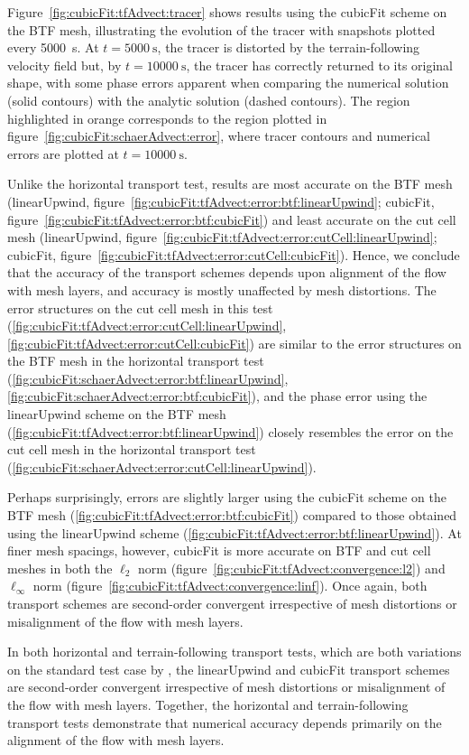 Figure~\ref{fig:cubicFit:tfAdvect:tracer} shows results using the cubicFit scheme on the BTF mesh, illustrating the evolution of the tracer with snapshots plotted every \SI{5000}{\second}.  At $t = \SI{5000}{\second}$, the tracer is distorted by the terrain-following velocity field but, by $t = \SI{10000}{\second}$, the tracer has correctly returned to its original shape, with some phase errors apparent when comparing the numerical solution (solid contours) with the analytic solution (dashed contours).  The region highlighted in orange corresponds to the region plotted in figure~\ref{fig:cubicFit:schaerAdvect:error}, where tracer contours and numerical errors are plotted at $t = \SI{10000}{\second}$.

Unlike the horizontal transport test, results are most accurate on the BTF mesh (linearUpwind, figure~\ref{fig:cubicFit:tfAdvect:error:btf:linearUpwind}; cubicFit, figure~\ref{fig:cubicFit:tfAdvect:error:btf:cubicFit}) and least accurate on the cut cell mesh
(linearUpwind, figure~\ref{fig:cubicFit:tfAdvect:error:cutCell:linearUpwind}; cubicFit, figure~\ref{fig:cubicFit:tfAdvect:error:cutCell:cubicFit}).
Hence, we conclude that the accuracy of the transport schemes depends upon alignment of the flow with mesh layers, and accuracy is mostly unaffected by mesh distortions.
The error structures on the cut cell mesh in this test (\ref{fig:cubicFit:tfAdvect:error:cutCell:linearUpwind}, \ref{fig:cubicFit:tfAdvect:error:cutCell:cubicFit}) are similar to the error structures on the BTF mesh in the horizontal transport test (\ref{fig:cubicFit:schaerAdvect:error:btf:linearUpwind}, \ref{fig:cubicFit:schaerAdvect:error:btf:cubicFit}), and the phase error using the linearUpwind scheme on the BTF mesh (\ref{fig:cubicFit:tfAdvect:error:btf:linearUpwind}) closely resembles the error on the cut cell mesh in the horizontal transport test (\ref{fig:cubicFit:schaerAdvect:error:cutCell:linearUpwind}).

Perhaps surprisingly, errors are slightly larger using the cubicFit scheme on the BTF mesh (\ref{fig:cubicFit:tfAdvect:error:btf:cubicFit}) compared to those obtained using the linearUpwind scheme (\ref{fig:cubicFit:tfAdvect:error:btf:linearUpwind}).  
At finer mesh spacings, however, cubicFit is more accurate on BTF and cut cell meshes in both the $\ell_2$ norm (figure~\ref{fig:cubicFit:tfAdvect:convergence:l2}) and $\ell_\infty$ norm (figure~\ref{fig:cubicFit:tfAdvect:convergence:linf}).  Once again, both transport schemes are second-order convergent irrespective of mesh distortions or misalignment of the flow with mesh layers.

In both horizontal and terrain-following transport tests, which are both variations on the standard test case by \citet{schaer2002}, the linearUpwind and cubicFit transport schemes are second-order convergent irrespective of mesh distortions or misalignment of the flow with mesh layers.
Together, the horizontal and terrain-following transport tests demonstrate that numerical accuracy depends primarily on the alignment of the flow with mesh layers.
